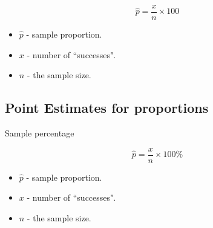 \documentclass[]{report}
\begin{document}
\[
\hat{p} = \frac{x}{n} \times 100%
\]

\begin{itemize}
\item $\hat{p}$ - sample proportion.
\item $x$  - number of ``successes".
\item $n$  - the sample size.
\end{itemize}


\subsection*{Point Estimates for proportions }

Sample percentage

\[
\hat{p} = \frac{x}{n} \times 100\%
\]

\begin{itemize}
\item $\hat{p}$ - sample proportion.
\item $x$  - number of ``successes".
\item $n$  - the sample size.
\end{itemize}
\end{document}
